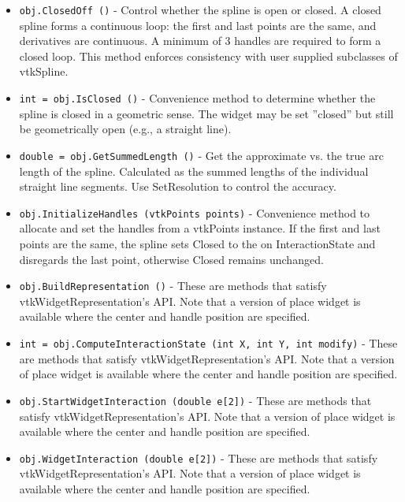 \begin{itemize}
\item  \verb|obj.ClosedOff ()| -  Control whether the spline is open or closed. A closed spline forms
 a continuous loop: the first and last points are the same, and
 derivatives are continuous.  A minimum of 3 handles are required to
 form a closed loop.  This method enforces consistency with
 user supplied subclasses of vtkSpline.

\item  \verb|int = obj.IsClosed ()| -  Convenience method to determine whether the spline is
 closed in a geometric sense.  The widget may be set ''closed'' but still
 be geometrically open (e.g., a straight line).

\item  \verb|double = obj.GetSummedLength ()| -  Get the approximate vs. the true arc length of the spline. Calculated as
 the summed lengths of the individual straight line segments. Use
 SetResolution to control the accuracy.

\item  \verb|obj.InitializeHandles (vtkPoints points)| -  Convenience method to allocate and set the handles from a vtkPoints
 instance.  If the first and last points are the same, the spline sets
 Closed to the on InteractionState and disregards the last point, otherwise Closed
 remains unchanged.

\item  \verb|obj.BuildRepresentation ()| -  These are methods that satisfy vtkWidgetRepresentation's API. Note that a 
 version of place widget is available where the center and handle position
 are specified.

\item  \verb|int = obj.ComputeInteractionState (int X, int Y, int modify)| -  These are methods that satisfy vtkWidgetRepresentation's API. Note that a 
 version of place widget is available where the center and handle position
 are specified.

\item  \verb|obj.StartWidgetInteraction (double e[2])| -  These are methods that satisfy vtkWidgetRepresentation's API. Note that a 
 version of place widget is available where the center and handle position
 are specified.

\item  \verb|obj.WidgetInteraction (double e[2])| -  These are methods that satisfy vtkWidgetRepresentation's API. Note that a 
 version of place widget is available where the center and handle position
 are specified.


\end{itemize}
